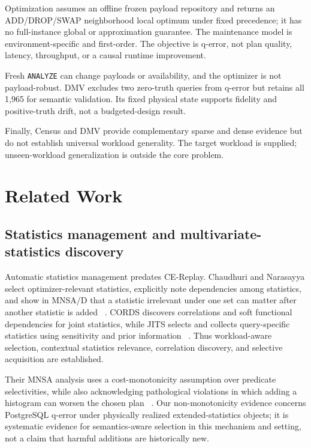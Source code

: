 \documentclass[sigconf,nonacm]{acmart}
\begin{document}
Optimization assumes an offline frozen payload repository and returns an ADD/DROP/SWAP neighborhood local optimum under fixed precedence; it has no full-instance global or approximation guarantee. The maintenance model is environment-specific and first-order. The objective is q-error, not plan quality, latency, throughput, or a causal runtime improvement.

Fresh \texttt{ANALYZE} can change payloads or availability, and the optimizer is not payload-robust. DMV excludes two zero-truth queries from q-error but retains all 1,965 for semantic validation. Its fixed physical state supports fidelity and positive-truth drift, not a budgeted-design result.

Finally, Census and DMV provide complementary sparse and dense evidence but do not establish universal workload generality. The target workload is supplied; unseen-workload generalization is outside the core problem.

\section{Related Work}\label{sec:9}

\subsection{Statistics management and multivariate-statistics discovery}

Automatic statistics management predates CE-Replay. Chaudhuri and Narasayya select optimizer-relevant statistics, explicitly note dependencies among statistics, and show in MNSA/D that a statistic irrelevant under one set can matter after another statistic is added ~\cite{chaudhuri2001statistics}. CORDS discovers correlations and soft functional dependencies for joint statistics, while JITS selects and collects query-specific statistics using sensitivity and prior information ~\cite{ilyas2004cords,elhelw2007jits}. Thus workload-aware selection, contextual statistics relevance, correlation discovery, and selective acquisition are established.

Their MNSA analysis uses a cost-monotonicity assumption over predicate selectivities, while also acknowledging pathological violations in which adding a histogram can worsen the chosen plan ~\cite{chaudhuri2001statistics}. Our non-monotonicity evidence concerns PostgreSQL q-error under physically realized extended-statistics objects; it is systematic evidence for semantics-aware selection in this mechanism and setting, not a claim that harmful additions are historically new.
\end{document}
